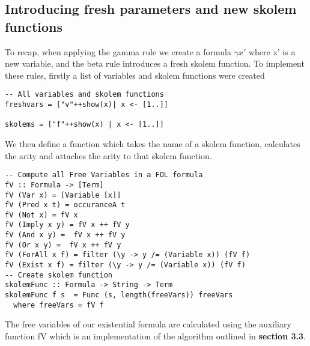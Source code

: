 \documentclass{article}%
\begin{document}
\subsection{Introducing fresh parameters and new skolem functions}
To recap, when applying the gamma rule we create a formula $\gamma{x'}$ where x' is a new variable, and the beta rule introduces a fresh skolem function. 
To implement these rules, firstly a list of variables and skolem functions were created
\begin{verbatim}
-- All variables and skolem functions
freshvars = ["v"++show(x)| x <- [1..]]

skolems = ["f"++show(x) | x <- [1..]]
\end{verbatim}
We then define a function which takes the name of a skolem function, calculates the arity and attaches the arity to that skolem function.
\begin{verbatim}
-- Compute all Free Variables in a FOL formula
fV :: Formula -> [Term]
fV (Var x) = [Variable [x]]
fV (Pred x t) = occuranceA t
fV (Not x) = fV x
fV (Imply x y) = fV x ++ fV y
fV (And x y) =  fV x ++ fV y
fV (Or x y) =  fV x ++ fV y
fV (ForAll x f) = filter (\y -> y /= (Variable x)) (fV f)
fV (Exist x f) = filter (\y -> y /= (Variable x)) (fV f)
-- Create skolem function
skolemFunc :: Formula -> String -> Term
skolemFunc f s  = Func (s, length(freeVars)) freeVars
  where freeVars = fV f
\end{verbatim}
 The free variables of our existential formula are calculated using the auxiliary function fV which is an implementation of the algorithm outlined in \textbf{section 3.3}.
\end{document}
